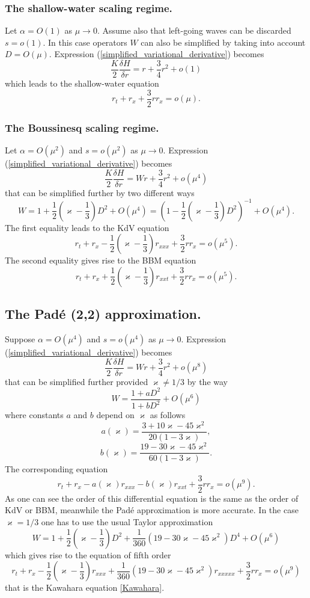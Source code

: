 \subsubsection{The shallow-water scaling regime.}
%
%
Let $\alpha = O(1)$ as $\mu \to 0$.
Assume also that left-going waves can be discarded $s = o(1)$.
In this case operators $W$ can also be simplified by
taking into account $D = O(\mu)$.
Expression (\ref{simplified_variational_derivative}) becomes
%
\[
	\frac{K}{2} \frac{\delta H}{\delta r}
	= r + \frac 34 r^2 + o(1)
\]
%
which leads to the shallow-water equation
%
\[
	r_t + r_x + \frac 32 r r_x = o(\mu)
	.
\]
%
%
\subsubsection{The Boussinesq scaling regime.}
%
%
Let $\alpha = O(\mu^2)$ and $s = o(\mu^2)$ as $\mu \to 0$.
Expression (\ref{simplified_variational_derivative}) becomes
%
\[
	\frac{K}{2} \frac{\delta H}{\delta r}
	= Wr + \frac 34 r^2 + o(\mu^4)
\]
%
that can be simplified further by two different ways
%
\[
	W = 1 + \frac 12 \left( \varkappa - \frac 13 \right) D^2 + O(\mu^4) 
	= \left( 1 - \frac 12 \left( \varkappa - \frac 13 \right) D^2 \right)
	^{-1} + O(\mu^4)
	.
\]
%
The first equality leads to the KdV equation
%
\[
	r_t + r_x - \frac 12 \left( \varkappa - \frac 13 \right) r_{xxx}
	+ \frac 32 r r_x = o(\mu^5)
	.
\]
%
The second equality gives rise to the BBM equation
%
\[
	r_t + r_x + \frac 12 \left( \varkappa - \frac 13 \right) r_{xxt}
	+ \frac 32 r r_x = o(\mu^5)
	.
\]
%
%
\subsection{The Pad\'e (2,2) approximation.}
%
%
Suppose $\alpha = O(\mu^4)$ and $s = o(\mu^4)$ as $\mu \to 0$.
Expression (\ref{simplified_variational_derivative}) becomes
%
\[
	\frac{K}{2} \frac{\delta H}{\delta r}
	= Wr + \frac 34 r^2 + o(\mu^8)
\]
%
that can be simplified further provided $\varkappa \neq 1/3$ by the way
%
\[
	W = \frac{ 1 + aD^2 }{ 1 + bD^2 } + O(\mu^6) 
\]
%
where constants $a$ and $b$ depend on $\varkappa$ as follows
%
\[
	a(\varkappa) = \frac
	{ 3 + 10 \varkappa - 45 \varkappa^2 }
	{ 20 (1 - 3 \varkappa) }
	,	
\]
%
\[
	b(\varkappa) = \frac
	{ 19 - 30 \varkappa - 45 \varkappa^2 }
	{ 60 (1 - 3 \varkappa) }
	.	
\]
%
The corresponding equation
%
\[
	r_t + r_x - a(\varkappa) r_{xxx} - b(\varkappa) r_{xxt}
	+ \frac 32 r r_x = o(\mu^9)
	.
\]
%
As one can see the order of this differential equation is the same
as the order of KdV or BBM, meanwhile the Pad\'e approximation
is more accurate.
In the case $\varkappa = 1/3$ one has to use
the usual Taylor approximation 
%
\[
	W = 1 + \frac 12 \left( \varkappa - \frac 13 \right) D^2
	+ \frac{1}{360} ( 19 - 30 \varkappa - 45 \varkappa^2 ) D^4 + O(\mu^6) 
\]
%
which gives rise to the equation of fifth order
%
\[
	r_t + r_x - \frac 12 \left( \varkappa - \frac 13 \right) r_{xxx}
	+ \frac{1}{360} ( 19 - 30 \varkappa - 45 \varkappa^2 ) r_{xxxxx}
	+ \frac 32 r r_x = o(\mu^9)
\]
that is the Kawahara equation \eqref{Kawahara}.
%
%
